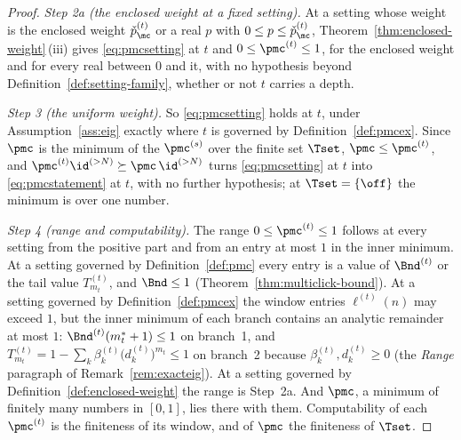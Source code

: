 \begin{proof}
\emph{Step 2a (the enclosed weight at a fixed setting).} At a setting whose
weight is the enclosed weight $\check p^{(t)}_{\mc}$ or a real $p$ with
$0\le p\le\check p^{(t)}_{\mc}$,
Theorem~\ref{thm:enclosed-weight}\,(iii) gives \eqref{eq:pmcsetting} at $t$
and $0\le\pmc^{(t)}\le1$, for the enclosed weight and for every real between
$0$ and it, with no hypothesis beyond Definition~\ref{def:setting-family},
whether or not $t$ carries a depth.

\emph{Step 3 (the uniform weight).} So \eqref{eq:pmcsetting} holds at $t$,
under Assumption~\ref{ass:eig} exactly where $t$ is governed by
Definition~\ref{def:pmcex}. Since
$\pmc$ is the minimum of the $\pmc^{(s)}$ over the finite set $\Tset$,
$\pmc\le\pmc^{(t)}$, and $\pmc^{(t)}\id^{(>N)}\succeq\pmc\,\id^{(>N)}$ turns
\eqref{eq:pmcsetting} at $t$ into \eqref{eq:pmcstatement} at $t$, with no
further hypothesis; at $\Tset=\{\off\}$ the minimum is over one number.

\emph{Step 4 (range and computability).} The range $0\le\pmc^{(t)}\le1$
follows at every setting from the positive part and from an entry at most $1$
in the inner minimum. At a setting governed by Definition~\ref{def:pmc} every
entry is a value of $\Bnd^{(t)}$ or the tail value $T^{(t)}_{m_t}$, and
$\Bnd\le1$ (Theorem~\ref{thm:multiclick-bound}). At a setting governed by
Definition~\ref{def:pmcex} the window entries $\ell^{(t)}(n)$ may exceed $1$,
but the inner minimum of each branch contains an analytic remainder at most
$1$: $\Bnd^{(t)}(m^{\ast}_t+1)\le1$ on branch~1, and
$T^{(t)}_{m_t}=1-\sum_k\beta^{(t)}_k\big(d^{(t)}_k\big)^{m_t}\le1$ on
branch~2 because $\beta^{(t)}_k,d^{(t)}_k\ge0$ (the \emph{Range} paragraph of
Remark~\ref{rem:exacteig}). At a setting governed by
Definition~\ref{def:enclosed-weight} the range is Step~2a. And $\pmc$, a
minimum of finitely many
numbers in $[0,1]$, lies there with them. Computability of each $\pmc^{(t)}$
is the finiteness of its window, and of $\pmc$ the finiteness of $\Tset$.
\end{proof}
